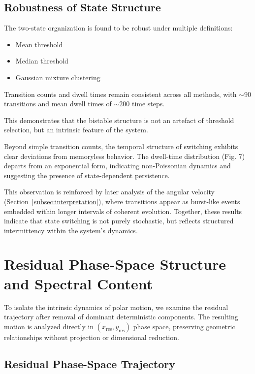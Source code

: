 \documentclass[twocolumn,9pt]{revtex4-2}
\begin{document}
\subsection{Robustness of State Structure}
\label{subsec:robustness_of_state_structure}

The two-state organization is found to be robust under
multiple definitions:

\begin{itemize}
\item Mean threshold
\item Median threshold
\item Gaussian mixture clustering
\end{itemize}

Transition counts and dwell times remain consistent
across all methods, with $\sim 90$ transitions and mean
dwell times of $\sim 200$ time steps.

This demonstrates that the bistable structure is not an
artefact of threshold selection, but an intrinsic feature
of the system.

Beyond simple transition counts, the temporal structure
of switching exhibits clear deviations from memoryless
behavior. The dwell-time distribution (Fig. 7) departs
from an exponential form, indicating non-Poissonian
dynamics and suggesting the presence of state-dependent
persistence.

This observation is reinforced by later analysis of the
angular velocity (Section~\ref{subsec:interpretation}), where transitions appear
as burst-like events embedded within longer intervals of
coherent evolution. Together, these results indicate that
state switching is not purely stochastic, but reflects
structured intermittency within the system’s dynamics.

\section{Residual Phase-Space Structure and Spectral Content}
\label{sec:residual_phase}

To isolate the intrinsic dynamics of polar motion, we examine the residual trajectory after removal of dominant deterministic components. The resulting motion is analyzed directly in $(x_{\mathrm{res}}, y_{\mathrm{res}})$ phase space, preserving geometric relationships without projection or dimensional reduction.

\subsection{Residual Phase-Space Trajectory}
\label{subsec:residual_phase_space_trajectory}
\end{document}
